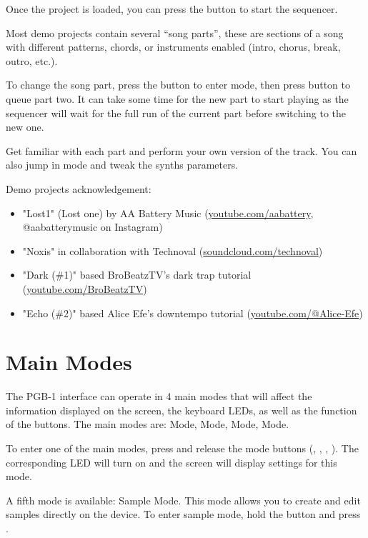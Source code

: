 \documentclass[8pt]{extarticle}
\def\device{PGB-1 }
\begin{document}
\begin{multicols*}{3}
Once the project is loaded, you can press the  button to start the sequencer.

Most demo projects contain several “song parts”, these are sections of a song with different patterns, chords, or instruments enabled (intro, chorus, break, outro, etc.).

To change the song part, press the  button to enter  mode, then press button  to queue part two. It can take some time for the new part to start playing as the sequencer will wait for the full run of the current part before switching to the new one.

Get familiar with each part and perform your own version of the track. You can also jump in  mode and tweak the synths parameters.

\hfill

Demo projects acknowledgement:
\begin{itemize}
    \item "Lost1" (Lost one) by AA Battery Music (\url{youtube.com/aabattery}, @aabatterymusic on Instagram)
    \item "Noxis" in collaboration with Technoval (\url{soundcloud.com/technoval})
    \item "Dark (\#1)" based BroBeatzTV's dark trap tutorial (\url{youtube.com/BroBeatzTV})
    \item "Echo (\#2)" based Alice Efe's downtempo tutorial (\url{youtube.com/@Alice-Efe})
\end{itemize}

\section{Main Modes}

The \device interface can operate in 4 main modes that will affect the information displayed on the screen, the keyboard LEDs, as well as the function of the buttons.
The main modes are:  Mode,  Mode,  Mode,  Mode.

To enter one of the main modes, press and release the mode buttons (, , , ). The corresponding LED will turn on and the screen will display settings for this mode.

\begin{notes}
    \item A fifth mode is available: Sample Mode. This mode allows you to create and edit samples directly on the device. To enter sample mode, hold the  button and press .
\end{notes}


\end{multicols*}
\end{document}
